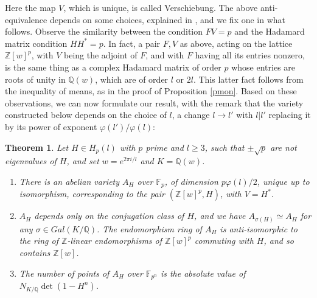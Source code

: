 \documentclass[11pt]{amsart}
\newtheorem{theorem}{Theorem}[section]
\theoremstyle{definition}
\begin{document}
Here the map $V$, which is unique, is called Verschiebung. The above anti-equivalence depends on some choices, explained in \cite{cst}, and we fix one in what follows. Observe the similarity between the condition $FV=p$ and the Hadamard matrix condition $HH^*=p$. In fact, a pair $F,V$ as above, acting on the lattice $\mathbb Z[w]^p$, with $V$ being the adjoint of $F$, and with $F$ having all its entries nonzero, is the same thing as a complex Hadamard matrix of order $p$ whose entries are roots of unity in $\mathbb Q(w)$, which are of order $l$ or $2l$. This latter fact follows from the inequality of means, as in the proof of Proposition \ref{pmon}. Based on these observations, we can now formulate our result, with the remark that the variety constructed below depends on the choice of $l$, a change $l\to l'$ with $l|l'$ replacing it by its power of exponent $\varphi(l')/\varphi(l)$:

\begin{theorem}\label{tav}
Let $H\in H_p(l)$ with $p$ prime and $l\geq3$, such that $\pm\sqrt{p}$ are not eigenvalues of $H$, and set $w=e^{2\pi i/l}$ and $K=\mathbb Q(w)$.
\begin{enumerate}
\item There is an abelian variety $A_H$ over $\mathbb F_p$, of dimension $p\varphi(l)/2$, unique up to isomorphism, corresponding to the pair $(\mathbb Z[w]^p,H)$, with $V=H^*$.

\item $A_H$ depends only on the conjugation class of $H$, and we have $A_{\sigma(H)}\simeq A_H$ for any $\sigma\in Gal(K/\mathbb Q)$. The endomorphism ring of $A_H$ is anti-isomorphic to the ring of $\mathbb Z$-linear endomorphisms of $\mathbb Z[w]^p$ commuting with $H$, and so contains $\mathbb Z[w]$.

\item The number of points of $A_H$ over $\mathbb F_{p^n}$ is the absolute value of $N_{K/\mathbb Q}\det(1-H^n)$.
\end{enumerate}
\end{theorem}
\end{document}

